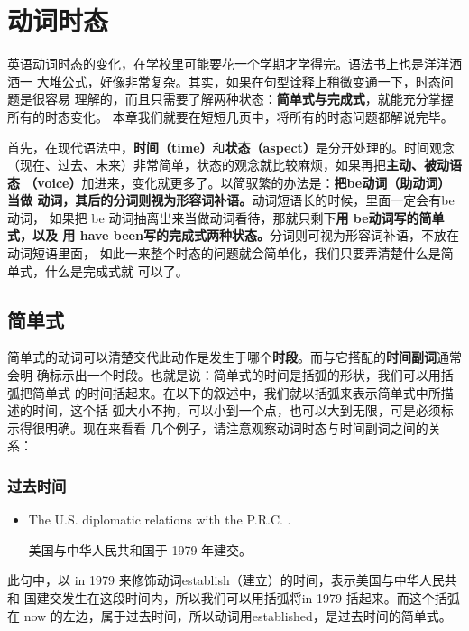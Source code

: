 \documentclass{yufa}
\newcommand\unbf[1]{\CJKunderline[thickness=0.8pt, textformat=\bfseries]{#1}}
\begin{document}
\chapter{动词时态}

英语动词时态的变化，在学校里可能要花一个学期才学得完。语法书上也是洋洋洒洒一
大堆公式，好像非常复杂。其实，如果在句型诠释上稍微变通一下，时态问题是很容易
理解的，而且只需要了解两种状态：\textbf{简单式与完成式}，就能充分掌握所有的时态变化。
本章我们就要在短短几页中，将所有的时态问题都解说完毕。

首先，在现代语法中，\textbf{时间（time）}和\textbf{状态（aspect）}是分开处理的。时间观念
（现在、过去、未来）非常简单，状态的观念就比较麻烦，如果再把\textbf{主动、被动语态
  （voice）}加进来，变化就更多了。以简驭繁的办法是：\textbf{把be动词（助动词）当做
  动词，其后的分词则视为形容词补语。}动词短语长的时候，里面一定会有be 动词，
如果把 be 动词抽离出来当做动词看待，那就只剩下\textbf{用 be动词写的简单式，以及
  用 have been写的完成式两种状态。}分词则可视为形容词补语，不放在动词短语里面，
如此一来整个时态的问题就会简单化，我们只要弄清楚什么是简单式，什么是完成式就
可以了。

\section{简单式}

简单式的动词可以清楚交代此动作是发生于哪个\textbf{时段}。而与它搭配的\textbf{时间副词}通常会明
确标示出一个时段。也就是说：简单式的时间是括弧的形状，我们可以用括弧把简单式
的时间括起来。在以下的叙述中，我们就以括弧来表示简单式中所描述的时间，这个括
弧大小不拘，可以小到一个点，也可以大到无限，可是必须标示得很明确。现在来看看
几个例子，请注意观察动词时态与时间副词之间的关系：

\subsection{过去时间}

\begin{itemize}
\item The U.S. \unbf{established} diplomatic relations with the P.R.C. \unbf{in 1979}.

  美国与中华人民共和国于 1979 年建交。
\end{itemize}

此句中，以 in 1979 来修饰动词establish（建立）的时间，表示美国与中华人民共和
国建交发生在这段时间内，所以我们可以用括弧将in 1979 括起来。而这个括弧在 now
的左边，属于过去时间，所以动词用established，是过去时间的简单式。
\end{document}
